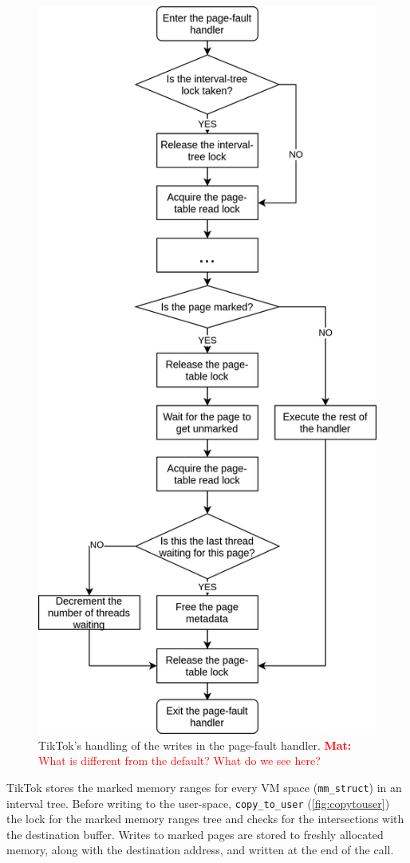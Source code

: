 \documentclass[conference]{IEEEtran}
\newcommand{\mat}[1]{\textcolor{red}{\textbf{Mat:} #1}}
\newcommand{\sysname}{TikTok}
\begin{document}
\begin{figure}[]
  \centering
  \includegraphics[width = 0.8\linewidth]{img/pagefault.png}
  \caption{\sysname's handling of the writes in the page-fault handler.
\mat{What is different from the default? What do we see here?}
}
  \label{fig:pagefault}
\end{figure}

\sysname{} stores the marked memory ranges for every VM space
(\texttt{mm\_struct}) in an interval tree. Before writing to the user-space,
\texttt{copy\_to\_user} (\autoref{fig:copytouser}) the lock for the marked
memory ranges tree and checks for the intersections with the destination buffer.
Writes to marked pages are stored to freshly allocated memory, along with the
destination address, and written at the end of the call.
\end{document}
